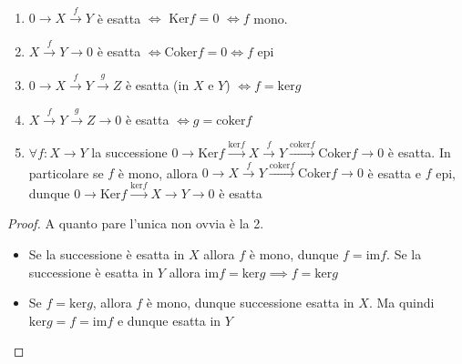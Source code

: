 \begin{proposition}{} \(\) 
\begin{enumerate}[label = \arabic*.] 
    \item \(0 \to X \overset{f}{\to } Y\) è esatta \(\iff\) \(\mathrm{Ker}f = 0\) \(\iff f \) mono.
    \item[\(1^{op}\).] \(X \overset{f}{\to} Y \to 0\) è esatta \(\iff \mathrm{Coker}f = 0 \iff f\) epi
    \item \(0 \to X \overset{f}{\to } Y \overset{g}{\to } Z\) è esatta (in \(X\) e \(Y\)) \(\iff f = \mathrm{ker}g\)
    \item[\(2^{op}\).] \(X \overset{f}{\to } Y \overset{g}{\to } Z \to 0\) è esatta \(\iff g = \mathrm{coker}f\)
    \item \(\forall f : X \to Y\) la successione \(0 \to \mathrm{Ker}f \overset{\mathrm{ker}f}{\to } X \overset{f}{\to} Y \overset{\mathrm{coker}f}{\to } \mathrm{Coker}f \to 0\) è esatta. In particolare se \(f\) è mono, allora \(0 \to X \overset{f}{\to } Y \overset{\mathrm{coker}f}{\to } \mathrm{Coker}f \to 0\) è esatta e \(f\) epi, dunque \(0 \to \mathrm{Ker}f \overset{\mathrm{ker}f}{\to } X \to Y \to 0\) è esatta
\end{enumerate}
\end{proposition}

\begin{proof}{}
    A quanto pare l'unica non ovvia è la 2.
    \begin{itemize}
        \item[\(\implies \)] Se la successione è esatta in \(X\) allora \(f\) è
            mono, dunque \(f = \mathrm{im}f\). Se la successione è esatta in \(Y\) allora \(\mathrm{im}f = \mathrm{ker}g \implies f = \mathrm{ker}g\) 
        \item[\(\impliedby \)] Se \(f = \mathrm{ker}g\), allora \(f\) è mono, dunque successione
    esatta in \(X\). Ma quindi \(\mathrm{ker}g = f = \mathrm{im}f\) e dunque esatta in \(Y\) 
    \end{itemize} 
\end{proof}

